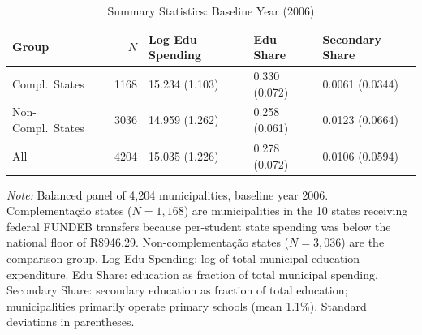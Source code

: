 \begin{table}[!h]
\centering
\caption{\label{tab:sumstats}Summary Statistics: Baseline Year (2006)}
\begin{threeparttable}
\begin{tabular}{lrlll}
\toprule
Group & $N$ & Log Edu Spending & Edu Share & Secondary Share \\
\midrule
Compl.\ States   & 1168 & 15.234 (1.103) & 0.330 (0.072) & 0.0061 (0.0344) \\
Non-Compl.\ States & 3036 & 14.959 (1.262) & 0.258 (0.061) & 0.0123 (0.0664) \\
All              & 4204 & 15.035 (1.226) & 0.278 (0.072) & 0.0106 (0.0594) \\
\bottomrule
\end{tabular}
\begin{tablenotes}
\small
\item \textit{Note:} Balanced panel of 4,204 municipalities, baseline year 2006.
Complementa\c{c}\~ao states ($N=1{,}168$) are municipalities in the 10 states receiving federal
FUNDEB transfers because per-student state spending was below the national floor of R\$946.29.
Non-complementa\c{c}\~ao states ($N=3{,}036$) are the comparison group.
Log Edu Spending: log of total municipal education expenditure.
Edu Share: education as fraction of total municipal spending.
Secondary Share: secondary education as fraction of total education; municipalities
primarily operate primary schools (mean 1.1\%).
Standard deviations in parentheses.
\end{tablenotes}
\end{threeparttable}
\end{table}
